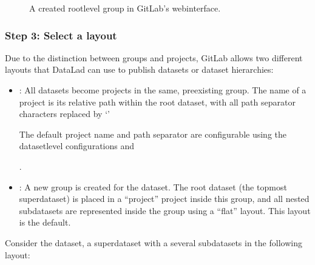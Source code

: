 \begin{figure}[tbp]
\centering
\capstart

\noindent{}
\caption{A created root\sphinxhyphen{}level group in GitLab’s webinterface.}\label{\detokenize{basics/101-139-hostingservices:id11}}\label{\detokenize{basics/101-139-hostingservices:fig-rootgroup-gitlab2}}\end{figure}


\subsubsection{Step 3: Select a layout}
\label{\detokenize{basics/101-139-hostingservices:step-3-select-a-layout}}
\sphinxAtStartPar
Due to the distinction between groups and projects, GitLab allows two different layouts that DataLad can use to publish datasets or dataset hierarchies:
\begin{itemize}
\item {} 
\sphinxAtStartPar
{}:
All datasets become projects in the same, pre\sphinxhyphen{}existing group.
The name of a project is its relative path within the root dataset, with all path separator characters replaced by ‘\sphinxhyphen{}’%
\begin{footnote}\sphinxAtStartFootnote
The default project name  and path separator \sphinxcode{\sphinxupquote{\sphinxhyphen{}}} are configurable using the dataset\sphinxhyphen{}level configurations  and 
%
\end{footnote}.

\item {} 
\sphinxAtStartPar
{}:
A new group is created for the dataset. The root dataset (the topmost superdataset) is placed in a “project” project inside this group, and all nested subdatasets are represented inside the group using a “flat” layout\sphinxfootnotemark[4]. This layout is the default.

\end{itemize}

\sphinxAtStartPar
Consider the  dataset, a superdataset with a several subdatasets in the following layout:

